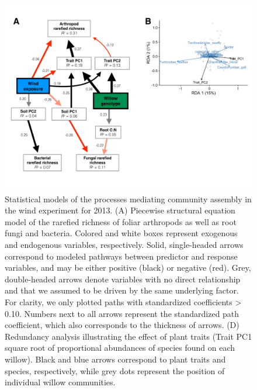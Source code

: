 \documentclass[11pt]{article}
\begin{document}
\begin{figure}[h!]
\centering
\includegraphics[scale = 0.4]{image05.png}
\caption{Statistical models of the processes mediating
community assembly in the wind experiment for 2013. (A) Piecewise
structural equation model of the rarefied richness of foliar arthropods
as well as root fungi and bacteria. Colored and white boxes represent
exogenous and endogenous variables, respectively. Solid, single-headed
arrows correspond to modeled pathways between predictor and response
variables, and may be either positive (black) or negative (red). Grey,
double-headed arrows denote variables with no direct relationship and
that we assumed to be driven by the same underlying factor. For clarity,
we only plotted paths with standardized coefficients \textgreater{}
0.10. Numbers next to all arrows represent the standardized path
coefficient, which also corresponds to the thickness of arrows. (D)
Redundancy analysis illustrating the effect of plant traits (Trait PC1
square root of proportional abundances of species found on each willow).
Black and blue arrows correspond to plant traits and species,
respectively, while grey
dots represent the position of individual willow communities.}
\label{Fig:SEMwind}
\end{figure}


\end{document}
